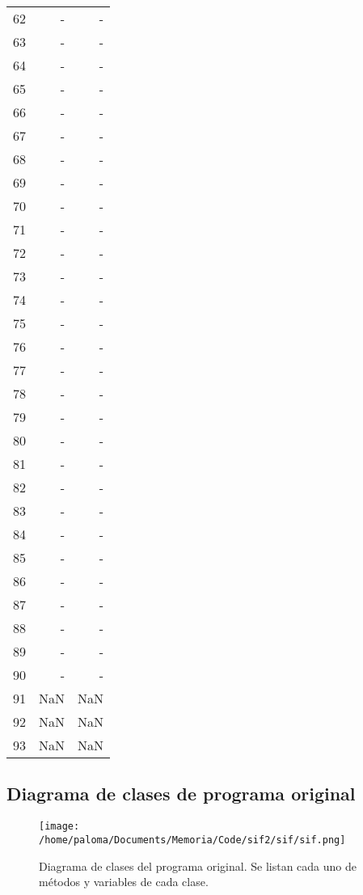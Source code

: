 \begin{appendix}
\begin{table}[h!]
\begin{tabular}{|l|r|r|}
62    & -        & -        \\
63    & -        & -        \\
64    & -        & -        \\
65    & -        & -        \\
66    & -        & -        \\
67    & -        & -        \\
68    & -        & -        \\
69    & -        & -        \\
70    & -        & -        \\
71    & -        & -        \\
72    & -        & -        \\
73    & -        & -        \\
74    & -        & -        \\
75    & -        & -        \\
76    & -        & -        \\
77    & -        & -        \\
78    & -        & -        \\
79    & -        & -        \\
80    & -        & -        \\
81    & -        & -        \\
82    & -        & -        \\
83    & -        & -        \\
84    & -        & -        \\
85    & -        & -        \\
86    & -        & -        \\
87    & -        & -        \\
88    & -        & -        \\
89    & -        & -        \\
90    & -        & -        \\
91    & NaN        & NaN        \\
92    & NaN        & NaN     \\
93    & NaN        & NaN      \\\hline
\end{tabular}
\label{ap:tab3}
\end{table}
\pagebreak
\begin{landscape}
\section{Diagrama de clases de programa original}
\begin{figure}[h!]
\centering
\texttt{[image: /home/paloma/Documents/Memoria/Code/sif2/sif/sif.png]}
\caption{Diagrama de clases del programa original. Se listan cada uno de m\'etodos y variables de cada clase.}
\label{fig:sif_class}
\end{figure}
\end{landscape}


\end{appendix}
